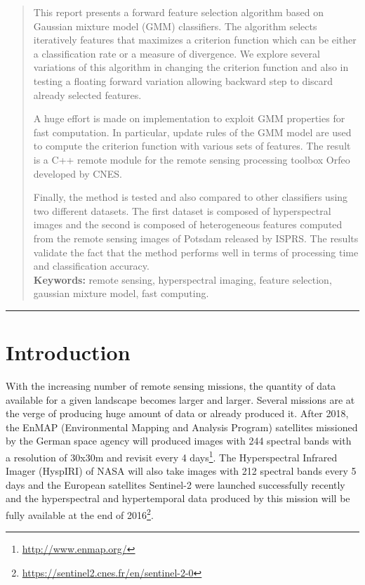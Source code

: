 \documentclass[a4paper,11pt,DIV=16,abstracton]{scrartcl}
\begin{document}
\begin{abstract}
This report presents a forward feature selection algorithm based on Gaussian mixture model (GMM) classifiers. The algorithm selects iteratively features that maximizes a criterion function which can be either a classification rate or a measure of divergence. We explore several variations of this algorithm in changing the criterion function and also in testing a floating forward variation allowing backward step to discard already selected features.

A huge effort is made on implementation to exploit GMM properties for fast computation. In particular, update rules of the GMM model are used to compute the criterion function with various sets of features. The result is a C++ remote module for the remote sensing processing toolbox Orfeo developed by CNES.

Finally, the method is tested and also compared to other classifiers using two different datasets. The first dataset is composed of hyperspectral images and the second is composed of heterogeneous features computed from the remote sensing images of Potsdam released by ISPRS. The results validate the fact that the method performs well in terms of processing time and classification accuracy.\\

{\bfseries Keywords:} remote sensing, hyperspectral imaging, feature selection, gaussian mixture model, fast computing.
\end{abstract}

\noindent\rule{\textwidth}{1.5pt}

\newpage

\tableofcontents
\newpage

\listoffigures
\newpage

\section{Introduction}

With the increasing number of remote sensing missions, the quantity of data available for a given landscape becomes larger and larger. Several missions are at the verge of producing huge amount of data or already produced it. After 2018, the EnMAP (Environmental Mapping and Analysis Program) satellites missioned by the German space agency will produced images with 244 spectral bands with a resolution of 30x30m and revisit every 4 days\footnote{\url{http://www.enmap.org/}}. The Hyperspectral Infrared Imager (HyspIRI) of NASA will also take images with 212 spectral bands every 5 days and the European satellites Sentinel-2 were launched successfully recently and the hyperspectral and hypertemporal data produced by this mission will be fully available at the end of 2016\footnote{\url{https://sentinel2.cnes.fr/en/sentinel-2-0}}.
\end{document}
